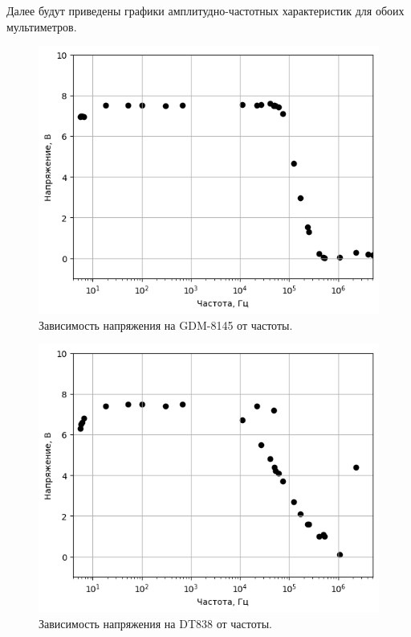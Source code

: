 \documentclass[a4paper,12pt]{article}
\begin{document}
\newpage

Далее будут приведены графики амплитудно-частотных характеристик для обоих мультиметров.
\begin{figure}[h!]
	\begin{center}
		\includegraphics[scale=0.55]{1.png}
	\end{center}
	\caption{Зависимость напряжения на GDM-8145 от частоты.}
\end{figure}

\begin{figure}[h!]
	\begin{center}
		\includegraphics[scale=0.55]{2.png}
	\end{center}
	\caption{Зависимость напряжения на DT838 от частоты.}
\end{figure}
\end{document}
